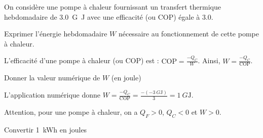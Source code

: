 On considère une pompe à chaleur fournissant un transfert thermique hebdomadaire de \SI{3,0}{G\joule} avec une efficacité (ou COP) égale à \SI{3,0}{}.


\debutEntrainement



\begin{enonce}
	Exprimer l'énergie hebdomadaire $W$ nécessaire au fonctionnement de cette pompe à chaleur.
	
\end{enonce}


\begin{corrige}
L'efficacité d'une pompe à chaleur (ou COP) est : $\text{COP}=\frac{-Q_C}{W}$. Ainsi, $W=\frac{-Q_C}{\text{COP}}$. 
\end{corrige}




\begin{enonce}
	Donner la valeur numérique de $W$ (en joule) \minusMedskip
	
\end{enonce}


\begin{corrige}
L'application numérique donne $W=\frac{-Q_C}{\text{COP}}=\frac{-(-\SI{3}{G\joule})}{3}=\SI{1}{G\joule}$. 

Attention,  pour une pompe à chaleur, on a $Q_F>0$, $Q_C<0$ et $W>0$.
\end{corrige}




\begin{enonce}
	Convertir \SI{1}{kWh} en joules
\end{enonce}


